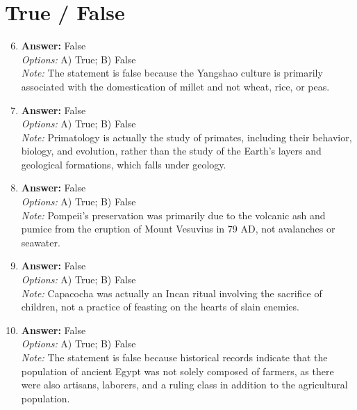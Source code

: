\documentclass[12pt]{article}
\begin{document}
\section*{True / False}
\begin{enumerate}[label=\arabic*.]
\setcounter{enumi}{5}
\item \textbf{Answer:} False
\\ \textit{Options:} A) True; B) False
\\ \textit{Note:} The statement is false because the Yangshao culture is primarily associated with the domestication of millet and not wheat, rice, or peas.
\item \textbf{Answer:} False
\\ \textit{Options:} A) True; B) False
\\ \textit{Note:} Primatology is actually the study of primates, including their behavior, biology, and evolution, rather than the study of the Earth's layers and geological formations, which falls under geology.
\item \textbf{Answer:} False
\\ \textit{Options:} A) True; B) False
\\ \textit{Note:} Pompeii's preservation was primarily due to the volcanic ash and pumice from the eruption of Mount Vesuvius in 79 AD, not avalanches or seawater.
\item \textbf{Answer:} False
\\ \textit{Options:} A) True; B) False
\\ \textit{Note:} Capacocha was actually an Incan ritual involving the sacrifice of children, not a practice of feasting on the hearts of slain enemies.
\item \textbf{Answer:} False
\\ \textit{Options:} A) True; B) False
\\ \textit{Note:} The statement is false because historical records indicate that the population of ancient Egypt was not solely composed of farmers, as there were also artisans, laborers, and a ruling class in addition to the agricultural population.
\end{enumerate}
\end{document}

